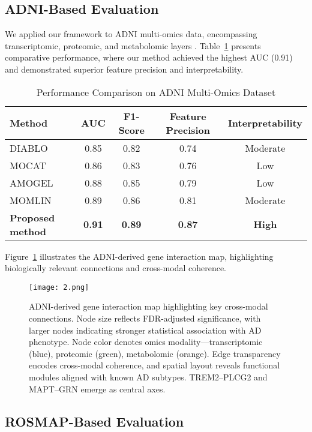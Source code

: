 \documentclass[12pt]{article}
\begin{document}
\subsection{ADNI-Based Evaluation}

We applied our framework to ADNI multi-omics data, encompassing transcriptomic, proteomic, and metabolomic layers \citep{sarma2025ml, xu2025adni, iturria2018multi, fang2025adni}. Table~\ref{tab:adni_comparison} presents comparative performance, where our method achieved the highest AUC (0.91) and demonstrated superior feature precision and interpretability.

\begin{table}[H]
\centering
\caption{Performance Comparison on ADNI Multi-Omics Dataset}
\begin{tabular}{lcccc}
\toprule
\textbf{Method} & \textbf{AUC} & \textbf{F1-Score} & \textbf{Feature Precision} & \textbf{Interpretability} \\
\midrule
DIABLO & 0.85 & 0.82 & 0.74 & Moderate \\
MOCAT & 0.86 & 0.83 & 0.76 & Low \\
AMOGEL & 0.88 & 0.85 & 0.79 & Low \\
MOMLIN & 0.89 & 0.86 & 0.81 & Moderate \\
\textbf{Proposed method} & \textbf{0.91} & \textbf{0.89} & \textbf{0.87} & \textbf{High} \\
\bottomrule
\end{tabular}
\label{tab:adni_comparison}
\end{table}

Figure~\ref{fig:adni_gene_map} illustrates the ADNI-derived gene interaction map, highlighting biologically relevant connections and cross-modal coherence.

\begin{figure}[H]
\centering
\texttt{[image: 2.png]}
\caption{ADNI-derived gene interaction map highlighting key cross-modal connections. Node size reflects FDR-adjusted significance, with larger nodes indicating stronger statistical association with AD phenotype. Node color denotes omics modality—transcriptomic (blue), proteomic (green), metabolomic (orange). Edge transparency encodes cross-modal coherence, and spatial layout reveals functional modules aligned with known AD subtypes. TREM2–PLCG2 and MAPT–GRN emerge as central axes.}
\label{fig:adni_gene_map}
\end{figure}

\subsection{ROSMAP-Based Evaluation}
\end{document}
